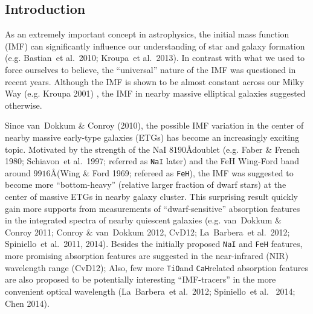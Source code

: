 \documentclass[preprint]{aastex}
\def\etal{{\ et al.~}}
\def\tio{{\tt TiO}}
\def\cah{{\tt CaH}}
\begin{document}
\begin{CJK*}{UTF8}{gbsn}
\maketitle


\section{Introduction}

  As an extremely important concept in astrophysics, the initial mass function 
  (IMF) can significantly influence our understanding of star and galaxy
  formation (e.g. Bastian\etal 2010; Kroupa\etal 2013).  In contrast with what 
  we used to force ourselves to believe, the ``universal'' nature of the IMF 
  was questioned in recent years.  Although the IMF is shown to be almost 
  constant across our Milky Way (e.g. Kroupa 2001) , the IMF in nearby massive
  elliptical galaxies suggested otherwise.  
  
  Since van~Dokkum \& Conroy (2010), the possible IMF variation in the center
  of nearby massive early-type galaxies (ETGs) has become an increasingly 
  exciting topic.  Motivated by the strength of the NaI $8190$\AA doublet 
  (e.g. Faber \& French 1980; Schiavon\etal 1997; referred as {\tt NaI} later)
  and the FeH Wing-Ford band around $9916$\AA (Wing \& Ford 1969; refereed as
  {\tt FeH}), the IMF was suggested to become more ``bottom-heavy'' (relative
  larger fraction of dwarf stars) at the center of massive ETGs in nearby 
  galaxy cluster.  This surprising result quickly gain more supports from 
  measurements of ``dwarf-sensitive'' absorption features in the integrated 
  spectra of nearby quiescent galaxies (e.g. van~Dokkum \& Conroy 2011; 
  Conroy \& van~Dokkum 2012, CvD12; La~Barbera\etal 2012; Spiniello\etal 2011,
  2014).  Besides the initially proposed {\tt NaI} and {\tt FeH} features,
  more promising absorption features are suggested in the near-infrared (NIR) 
  wavelength range (CvD12); Also, few more \tio and \cah related absorption 
  features are also proposed to be potentially interesting ``IMF-tracers'' in 
  the more convenient optical wavelength (La~Barbera\etal 2012; Spiniello\etal 
  2014; Chen 2014). 
  

\end{CJK*}
\end{document}
